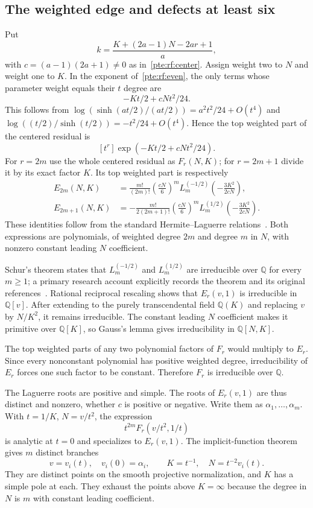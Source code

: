 \documentclass[11pt,a4paper]{article}
\numberwithin{equation}{section}
\theoremstyle{definition}
\theoremstyle{plain}
\begin{document}
\subsection{The weighted edge and defects at least six}
Put
\[
 k=\frac{K+(2a-1)N-2ar+1}{a},
\]
with $c=(a-1)(2a+1)\ne0$ as in~\eqref{pte:rf:center}. Assign weight two to $N$ and weight one to $K$. In the exponent of~\eqref{pte:rf:even}, the only terms whose parameter weight equals their $t$ degree are
\[
 -Kt/2+cNt^2/24.
\]
This follows from $\log(\sinh(at/2)/(at/2))=a^2t^2/24+O(t^4)$ and $\log((t/2)/\sinh(t/2))=-t^2/24+O(t^4)$. Hence the top weighted part of the centered residual is
\[
 [t^r]\exp(-Kt/2+cNt^2/24).
\]
For $r=2m$ use the whole centered residual as $F_r(N,K)$; for $r=2m+1$ divide it by its exact factor $K$. Its top weighted part is respectively
\begin{align}
 E_{2m}(N,K)&=\frac{m!}{(2m)!}\left(\frac{cN}{6}\right)^m
       L_m^{(-1/2)}\left(-\frac{3K^2}{2cN}\right),\label{pte:rf:edgeeven}\\
 E_{2m+1}(N,K)&=-\frac{m!}{2(2m+1)!}\left(\frac{cN}{6}\right)^m
       L_m^{(1/2)}\left(-\frac{3K^2}{2cN}\right).\label{pte:rf:edgeodd}
\end{align}
These identities follow from the standard Hermite--Laguerre relations~\cite{pte-dlmf18}. Both expressions are polynomials, of weighted degree $2m$ and degree $m$ in $N$, with nonzero constant leading $N$ coefficient.

Schur's theorem states that $L_m^{(-1/2)}$ and $L_m^{(1/2)}$ are irreducible over $\mathbb Q$ for every $m\ge1$; a primary research account explicitly records the theorem and its original references~\cite[pp.~1--2]{pte-schur}. Rational reciprocal rescaling shows that $E_r(v,1)$ is irreducible in $\mathbb Q[v]$. After extending to the purely transcendental field $\mathbb Q(K)$ and replacing $v$ by $N/K^2$, it remains irreducible. The constant leading $N$ coefficient makes it primitive over $\mathbb Q[K]$, so Gauss's lemma gives irreducibility in $\mathbb Q[N,K]$.

The top weighted parts of any two polynomial factors of $F_r$ would multiply to $E_r$. Since every nonconstant polynomial has positive weighted degree, irreducibility of $E_r$ forces one such factor to be constant. Therefore $F_r$ is irreducible over $\mathbb Q$.

The Laguerre roots are positive and simple. The roots of $E_r(v,1)$ are thus distinct and nonzero, whether $c$ is positive or negative. Write them as $\alpha_1,\ldots,\alpha_m$. With $t=1/K$, $N=v/t^2$, the expression
\[
 t^{2m}F_r(v/t^2,1/t)
\]
is analytic at $t=0$ and specializes to $E_r(v,1)$. The implicit-function theorem gives $m$ distinct branches
\begin{equation}\label{pte:rf:branches}
 v=v_i(t),\quad v_i(0)=\alpha_i,\qquad K=t^{-1},\quad N=t^{-2}v_i(t).
\end{equation}
They are distinct points on the smooth projective normalization, and $K$ has a simple pole at each. They exhaust the points above $K=\infty$ because the degree in $N$ is $m$ with constant leading coefficient.
\end{document}
